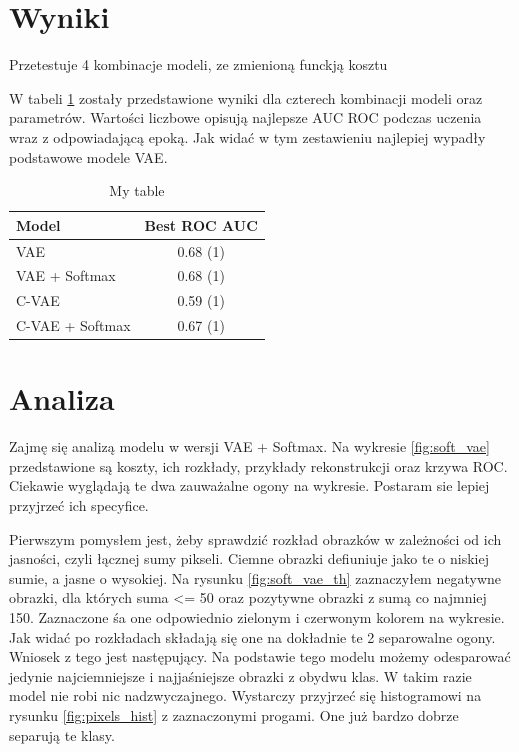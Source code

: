 \section{Wyniki}

Przetestuje 4 kombinacje modeli, ze zmienioną funckją kosztu

W tabeli \ref{table:results} zostały przedstawione wyniki dla czterech kombinacji modeli oraz parametrów. Wartości liczbowe opisują najlepsze AUC ROC podczas uczenia wraz z odpowiadającą epoką. Jak widać w tym zestawieniu najlepiej wypadły podstawowe modele VAE.

\begin{table}[h!]
	\centering
    \begin{tabular}{ l | c }
    \toprule
    Model 			& Best ROC AUC \\ \midrule
    VAE 				& 0.68 (1) \\
    VAE + Softmax 	& 0.68 (1) \\
    C-VAE 			& 0.59 (1) \\
    C-VAE + Softmax & 0.67 (1) \\
    \bottomrule
    \end{tabular}
    \caption{My table}
	\label{table:results}
\end{table}

\section{Analiza}

Zajmę się analizą modelu w wersji VAE + Softmax. Na wykresie \ref{fig:soft_vae} przedstawione są koszty, ich rozkłady, przykłady rekonstrukcji oraz krzywa ROC. Ciekawie wyglądają te dwa zauważalne ogony na wykresie. Postaram sie lepiej przyjrzeć ich specyfice. 

Pierwszym pomysłem jest, żeby sprawdzić rozkład obrazków w zależności od ich jasności, czyli łącznej sumy pikseli. Ciemne obrazki defiuniuje jako te o niskiej sumie, a jasne o wysokiej. Na rysunku \ref{fig:soft_vae_th} zaznaczyłem negatywne obrazki, dla których suma <= 50 oraz pozytywne obrazki z sumą co najmniej 150. Zaznaczone śa one odpowiednio zielonym i czerwonym kolorem na wykresie. Jak widać po rozkładach składają się one na dokładnie te 2 separowalne ogony. Wniosek z tego jest następujący. Na podstawie tego modelu możemy odesparować jedynie najciemniejsze i najjaśniejsze obrazki z obydwu klas. W takim razie model nie robi nic nadzwyczajnego. Wystarczy przyjrzeć się histogramowi na rysunku \ref{fig:pixels_hist} z zaznaczonymi progami. One już bardzo dobrze separują te klasy. 

